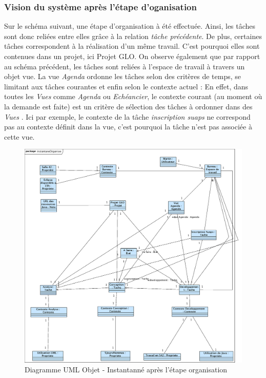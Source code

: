 \subsubsection{Vision du système après l'étape d'oganisation}
Sur le schéma suivant, une étape d'organisation à été effectuée. Ainsi, les tâches sont donc reliées entre elles grâce à la relation \textit{tâche précédente}. De plus, certaines tâches correspondent à la réalisation d'un même travail. C'est pourquoi elles sont contenues dans un projet, ici Projet GLO. On observe également que par rapport au schéma précédent, les tâches sont reliées à l'espace de travail à travers un objet vue. La vue \textit{Agenda} ordonne les tâches selon des critères de temps, se limitant aux tâches courantes et enfin selon le contexte actuel : En effet, dans toutes les \textit{Vues} comme \textit{Agenda} ou \textit{Echéancier}, le contexte courant (au moment où la demande est faite) est un critère de sélection des tâches à ordonner dans des \textit{Vues} . Ici par exemple, le contexte de la tâche \textit{inscription suaps} ne correspond pas au contexte définit dans la vue, c'est pourquoi la tâche n'est pas associée à cette vue.

\begin{figure}[H]
\begin{center}
\includegraphics[scale=0.29,angle=90]{diagrams/instantaneOrganiserAfter.png}
\caption{Diagramme UML Objet - Instantanné après l'étape organisation}
\end{center}
\end{figure}

